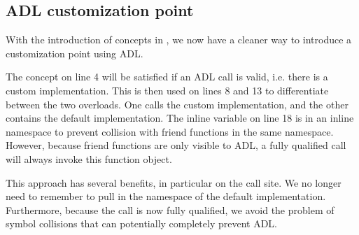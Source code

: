 \subsection{\texorpdfstring{ ADL customization point}{C++20 ADL customization point}}

With the introduction of concepts in , we now have a cleaner way to introduce a customization point using ADL.

\begin{box-note}
\footnotesize The concept on line 4 will be satisfied if an ADL call is valid, i.e. there is a custom implementation. This is then used on lines 8 and 13 to differentiate between the two overloads. One calls the custom implementation, and the other contains the default implementation. The inline variable on line 18 is in an inline namespace to prevent collision with friend functions in the same namespace. However, because friend functions are only visible to ADL, a fully qualified call will always invoke this function object.
\tcblower
{}
\end{box-note}

This approach has several benefits, in particular on the call site. We no longer need to remember to pull in the namespace of the default implementation. Furthermore, because the call is now fully qualified, we avoid the problem of symbol collisions that can potentially completely prevent ADL.